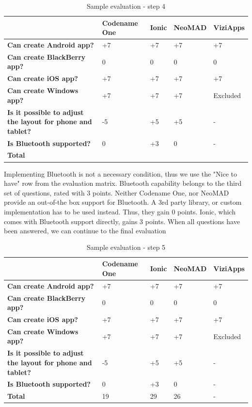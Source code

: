 \documentclass[english,master,public,dept460,male,cpdeclaration,oneside]{diploma}
\begin{document}
\begin{table}[!h]
	\centering
	\caption{Sample evaluation - step 4}
	\begin{tabular}{p{2.5cm} | p{2.5cm} | p{2.5cm} | p{2.5cm} | p{2.5cm}}
		\toprule
		& \textbf{Codename One} & \textbf{Ionic} & \textbf{NeoMAD} & \textbf{ViziApps} \\
		\midrule
		\textbf{Can create Android app?} & +7 & +7 & +7 & +7 \\
		\textbf{Can create BlackBerry app?} & 0 & 0 & 0 & 0 \\
		\textbf{Can create iOS app?} & +7 & +7 & +7 & +7 \\
		\textbf{Can create Windows app?} & +7 & +7 & +7 & Excluded \\
		\midrule
		\textbf{Is it possible to adjust the layout for phone and tablet?} & -5 & +5 & +5 & - \\
		\midrule
		\textbf{Is Bluetooth supported?} & 0 & +3 & 0 & - \\
		\midrule
		\textbf{Total} &&&& \\
		\midrule
	\end{tabular}
\end{table}

Implementing Bluetooth is not a necessary condition, thus we use the "Nice to have" row from the evaluation matrix. Bluetooth capability belongs to the third set of questions, rated with 3 points. Neither Codename One, nor NeoMAD provide an out-of-the box support for Bluetooth. A 3rd party library, or custom implementation has to be used instead. Thus, they gain 0 points. Ionic, which comes with Bluetooth support directly, gains 3 points. When all questions have been answered, we can continue to the final evaluation

\begin{table}[!h]
	\centering
	\caption{Sample evaluation - step 5}
	\begin{tabular}{p{2.5cm} | p{2.5cm} | p{2.5cm} | p{2.5cm} | p{2.5cm}}
		\toprule
		& \textbf{Codename One} & \textbf{Ionic} & \textbf{NeoMAD} & \textbf{ViziApps} \\
		\midrule
		\textbf{Can create Android app?} & +7 & +7 & +7 & +7 \\
		\textbf{Can create BlackBerry app?} & 0 & 0 & 0 & 0 \\
		\textbf{Can create iOS app?} & +7 & +7 & +7 & +7 \\
		\textbf{Can create Windows app?} & +7 & +7 & +7 & Excluded \\
		\midrule
		\textbf{Is it possible to adjust the layout for phone and tablet?} & -5 & +5 & +5 & - \\
		\midrule
		\textbf{Is Bluetooth supported?} & 0 & +3 & 0 & - \\
		\midrule
		\textbf{Total} & 19 & 29 & 26 & - \\
		\midrule
	\end{tabular}
\end{table}
\end{document}
